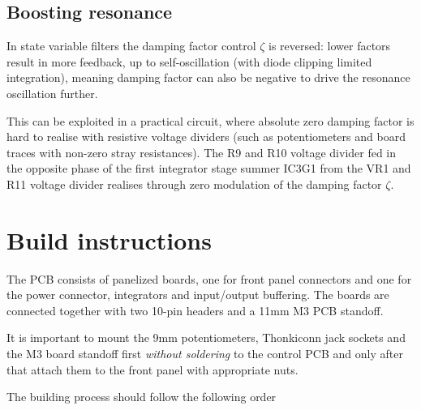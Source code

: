 \documentclass{article}
\begin{document}
\subsection{Boosting resonance}

In state variable filters the damping factor control $\zeta$ is reversed: lower factors result in more feedback, up to self-oscillation (with diode clipping limited integration), meaning damping factor can also be negative to drive the resonance oscillation further.\newline

This can be exploited in a practical circuit, where absolute zero damping factor is hard to realise with resistive voltage dividers (such as potentiometers and board traces with non-zero stray resistances). The R9 and R10 voltage divider fed in the opposite phase of the first integrator stage summer IC3G1 from the VR1 and R11 voltage divider realises through zero modulation of the damping factor $\zeta$. 

\section{Build instructions} \label{buildinstructions}

The PCB consists of panelized boards, one for front panel connectors and one for the power connector, integrators and input/output buffering. The boards are connected together with two 10-pin headers and a 11mm M3 PCB standoff.\newline


It is important to mount the 9mm potentiometers, Thonkiconn jack sockets and the M3 board standoff first \emph{without soldering} to the control PCB and only after that attach them to the front panel with appropriate nuts. \newline


The building process should follow the following order
\end{document}
